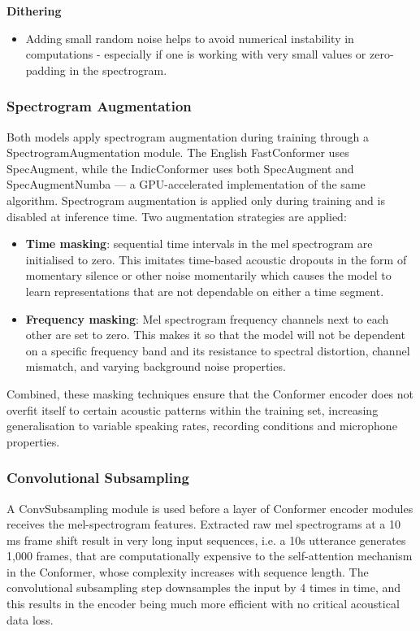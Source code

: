 \textbf{Dithering}
\begin{itemize}
    \item Adding small random noise helps to avoid numerical instability in computations - especially if one is working with very small values or zero-padding in the spectrogram.
\end{itemize}

\subsubsection{Spectrogram Augmentation}
Both models apply spectrogram augmentation during training through a SpectrogramAugmentation module. The English FastConformer uses SpecAugment, while the IndicConformer uses both SpecAugment and SpecAugmentNumba — a GPU-accelerated implementation of the same algorithm. Spectrogram augmentation is applied only during training and is disabled at inference time. Two augmentation strategies are applied:

\begin{itemize}
\item \textbf{Time masking}: sequential time intervals in the mel spectrogram are initialised to zero. This imitates time-based acoustic dropouts in the form of momentary silence or other noise momentarily which causes the model to learn representations that are not dependable on either a time segment.

\item \textbf{Frequency masking}: Mel spectrogram frequency channels next to each other are set to zero. This makes it so that the model will not be dependent on a specific frequency band and its resistance to spectral distortion, channel mismatch, and varying background noise properties.
\end{itemize}

Combined, these masking techniques ensure that the Conformer encoder does not overfit itself to certain acoustic patterns within the training set, increasing generalisation to variable speaking rates, recording conditions and microphone properties.


\subsubsection{Convolutional Subsampling}
A ConvSubsampling module is used before a layer of Conformer encoder modules receives the mel-spectrogram features. Extracted raw mel spectrograms at a 10 ms frame shift result in very long input sequences, i.e. a 10s utterance generates 1,000 frames, that are computationally expensive to the self-attention mechanism in the Conformer, whose complexity increases with sequence length. The  convolutional subsampling step downsamples the input by 4 times in time, and this results in the encoder being much more efficient with no critical acoustical data loss.

